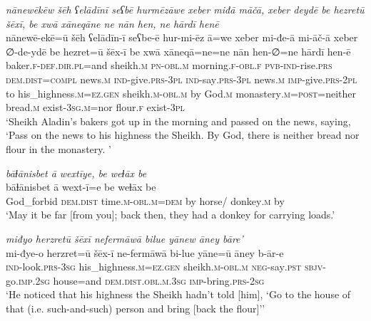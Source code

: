 \ea \label{HB.2}
\textit{nānewēkēw šēh ʕelādīnī seʕbē hurmēzāwe xeber miđā māčā, xeber deydē be hezretū šēxī, be xwā xāneqāne ne nān hen, ne hārdī henē} \\ 
\gll nānewē-ekē=ū šēh ʕelādīn-ī seʕbe-ē hur-mi-ēz ā=we xeber mi-đe-ā mi-āč-ā xeber ∅-de-ydē be hezret=ū šēx-ī be xwā xāneqā=ne=ne nān hen-∅=ne hārdī hen-ē \\ 
 baker\textsc{\textsc{.f}}\textsc{-def}\textsc{.dir}\textsc{.pl}=and sheikh\textsc{.m} \textsc{pn}\textsc{-obl}\textsc{.m} morning\textsc{\textsc{.f}}\textsc{-obl}\textsc{\textsc{.f}} \textsc{pvb-}\textsc{ind-}rise\textsc{.prs} \textsc{dem.dist}\textsc{=compl} news\textsc{.m} \textsc{ind-}give\textsc{.prs}\textsc{-3pl} \textsc{ind-}say\textsc{.prs}\textsc{-3pl} news\textsc{.m} \textsc{imp-}give\textsc{.prs}\textsc{-2pl} to his\_highness\textsc{.m}\textsc{=ez}\textsc{.gen} sheikh\textsc{.m}\textsc{-obl}\textsc{.m} by God\textsc{.m} monastery\textsc{.m}\textsc{=\textsc{post}}=neither bread\textsc{.m} exist\textsc{-3sg}\textsc{.m}=nor flour\textsc{\textsc{.f}} exist\textsc{-3pl} \\ 
\glt `Sheikh Aladin’s bakers got up in the morning and passed on the news, saying, ‘Pass on the news to his highness the Sheikh. By God, there is neither bread nor flour in the monastery. '
\z 
 
\ea \label{HB.8}
\textit{bāɫānisbet ā wextīye, be weɫāx be} \\ 
\gll bāɫānisbet ā wext-ī=e be weɫāx be \\ 
 God\_forbid \textsc{dem.dist} time\textsc{.m}\textsc{-obl}\textsc{.m}\textsc{=dem} by horse/ donkey\textsc{.m} by \\ 
\glt `May it be far [from you]; back then, they had a donkey for carrying loads.'
\z 
 
\ea \label{HB.17}
\textit{miđyo herzretū šēxī nefermāwā bilue yānew āney bāre’} \\ 
\gll mi-đye-o herzret=ū šēx-ī ne-fermāwā bi-lue yāne=ū āney b-ār-e \\ 
 \textsc{ind-}look\textsc{.prs}\textsc{-3sg} his\_highness\textsc{.m}\textsc{=ez}\textsc{.gen} sheikh\textsc{.m}\textsc{-obl}\textsc{.m} \textsc{neg-}say\textsc{.pst} \textsc{sbjv-}go\textsc{.imp}\textsc{.\textsc{2sg}} house=and \textsc{dem.dist}\textsc{.obl}\textsc{.m}\textsc{.3sg} \textsc{imp-}bring\textsc{.prs}-\textsc{2sg} \\ 
\glt `He noticed that his highness the Sheikh hadn’t told [him], ‘Go to the house of that (i.e. such-and-such) person and bring [back the flour]’'
\z 
 
